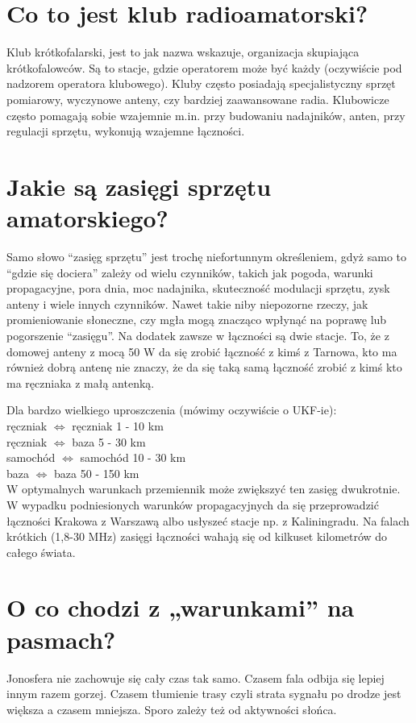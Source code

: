 \documentclass[a4paper,12pt]{article}
\begin{document}
\section{Co to jest klub radioamatorski?}
Klub krótkofalarski, jest to jak nazwa wskazuje, organizacja skupiająca krótkofalowców. Są to stacje, gdzie operatorem może być każdy (oczywiście pod nadzorem operatora klubowego). Kluby często posiadają specjalistyczny sprzęt pomiarowy, wyczynowe anteny, czy bardziej zaawansowane radia. Klubowicze często pomagają sobie wzajemnie m.in. przy budowaniu nadajników, anten, przy regulacji sprzętu, wykonują wzajemne łączności. 

\section{Jakie są zasięgi sprzętu amatorskiego?}
Samo słowo “zasięg sprzętu” jest trochę niefortunnym określeniem, gdyż samo to “gdzie się dociera” zależy od wielu czynników, takich jak pogoda, warunki propagacyjne, pora dnia, moc nadajnika, skuteczność modulacji sprzętu, zysk anteny i wiele innych czynników. Nawet takie niby niepozorne rzeczy, jak promieniowanie słoneczne, czy mgła mogą znacząco wpłynąć na poprawę lub pogorszenie “zasięgu”.
Na dodatek zawsze w łączności są dwie stacje. To, że z domowej anteny z mocą 50 W da się zrobić łączność z kimś z Tarnowa, kto ma również dobrą antenę nie znaczy, że da się taką samą łączność zrobić z kimś kto ma ręczniaka z małą antenką. 

Dla bardzo wielkiego uproszczenia (mówimy oczywiście o UKF-ie):\\
ręczniak $\Leftrightarrow$ ręczniak 1 - 10 km\\
ręczniak $\Leftrightarrow$ baza 5 - 30 km\\
samochód $\Leftrightarrow$ samochód 10 - 30 km\\
baza $\Leftrightarrow$ baza 50 - 150 km \\

W optymalnych warunkach przemiennik może zwiększyć ten zasięg dwukrotnie.
W wypadku podniesionych warunków propagacyjnych da się przeprowadzić łączności Krakowa z Warszawą albo usłyszeć stacje np. z Kaliningradu.
Na falach krótkich (1,8-30 MHz) zasięgi łączności wahają się od kilkuset kilometrów do całego świata. 

\section{O co chodzi z „warunkami” na pasmach?}
Jonosfera nie zachowuje się cały czas tak samo. Czasem fala odbija się lepiej innym razem gorzej. Czasem tłumienie trasy czyli strata sygnału po drodze jest większa a czasem mniejsza. 
Sporo zależy też od aktywności słońca.
\end{document}
